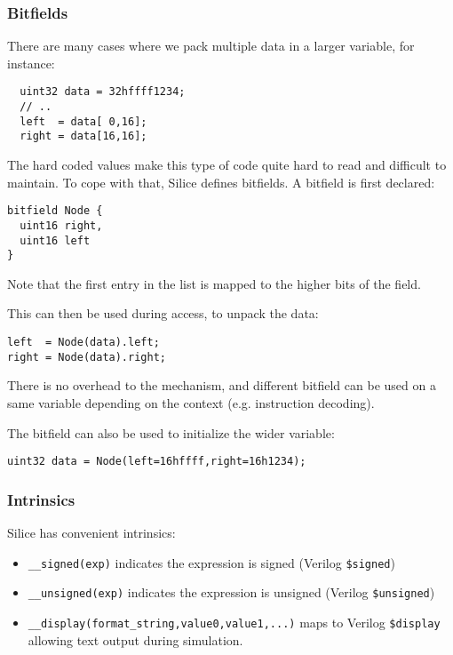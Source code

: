 \documentclass[a4]{article}
\newcommand\silice{Silice}
\begin{document}
\subsubsection{Bitfields}
\label{sec:bitfields}

There are many cases where we pack multiple data in a larger variable, for instance:

\begin{verbatim}
  uint32 data = 32hffff1234;
  // ..
  left  = data[ 0,16];
  right = data[16,16];
\end{verbatim}

The hard coded values make this type of code quite hard to read and difficult to maintain. To cope with that, \silice{} defines bitfields. A bitfield is first declared:

\begin{verbatim}
bitfield Node {
  uint16 right,
  uint16 left
}
\end{verbatim}

Note that the first entry in the list is mapped to the higher bits of the field.

This can then be used during access, to unpack the data:

\begin{verbatim}
left  = Node(data).left;
right = Node(data).right;
\end{verbatim}

There is no overhead to the mechanism, and different bitfield can be used on a same
variable depending on the context (e.g. instruction decoding).

The bitfield can also be used to initialize the wider variable:
\begin{verbatim}
uint32 data = Node(left=16hffff,right=16h1234);
\end{verbatim}

\subsubsection{Intrinsics}

\silice{} has convenient intrinsics:

\begin{itemize}
	\item \texttt{\_\_signed(exp)} indicates the expression is signed (Verilog \texttt{\$signed})
	\item \texttt{\_\_unsigned(exp)} indicates the expression is unsigned (Verilog \texttt{\$unsigned})
	\item \texttt{\_\_display(format\_string,value0,value1,...)} maps to Verilog \texttt{\$display} allowing text output during simulation.
\end{itemize}
	
\end{document}

